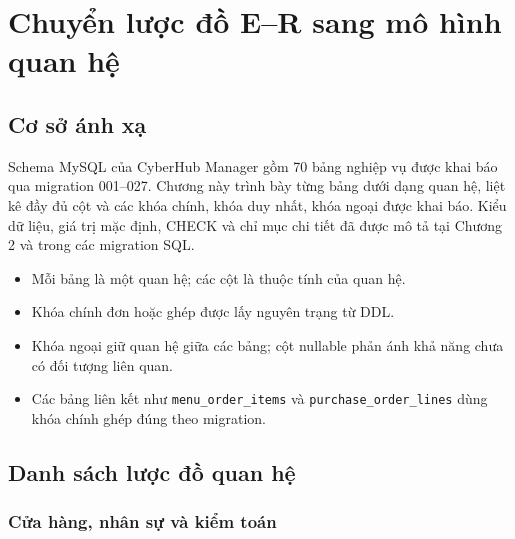 \chapter{Chuyển lược đồ E--R sang mô hình quan hệ}

\section{Cơ sở ánh xạ}

Schema MySQL của CyberHub Manager gồm 70 bảng nghiệp vụ được khai báo qua migration 001--027. Chương này trình bày từng bảng dưới dạng quan hệ, liệt kê đầy đủ cột và các khóa chính, khóa duy nhất, khóa ngoại được khai báo. Kiểu dữ liệu, giá trị mặc định, CHECK và chỉ mục chi tiết đã được mô tả tại Chương 2 và trong các migration SQL.

\begin{itemize}

\item Mỗi bảng là một quan hệ; các cột là thuộc tính của quan hệ.

\item Khóa chính đơn hoặc ghép được lấy nguyên trạng từ DDL.

\item Khóa ngoại giữ quan hệ giữa các bảng; cột nullable phản ánh khả năng chưa có đối tượng liên quan.

\item Các bảng liên kết như \texttt{menu\_order\_items} và \texttt{purchase\_order\_lines} dùng khóa chính ghép đúng theo migration.

\end{itemize}

\section{Danh sách lược đồ quan hệ}

\subsection{Cửa hàng, nhân sự và kiểm toán}

